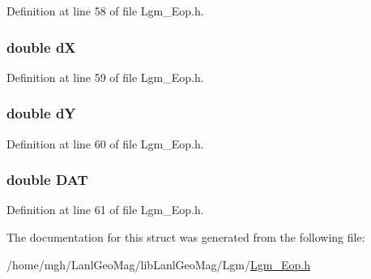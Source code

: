 Definition at line 58 of file Lgm\_\-Eop.h.\hypertarget{struct_lgm___eop_one_5559d17f092df97e1797a76209e0caa0}{
\subsubsection[{dX}]{\setlength{\rightskip}{0pt plus 5cm}double {\bf dX}}}
\label{struct_lgm___eop_one_5559d17f092df97e1797a76209e0caa0}




Definition at line 59 of file Lgm\_\-Eop.h.\hypertarget{struct_lgm___eop_one_5b69e4344b7089d8a3c6db32a3c38551}{
\subsubsection[{dY}]{\setlength{\rightskip}{0pt plus 5cm}double {\bf dY}}}
\label{struct_lgm___eop_one_5b69e4344b7089d8a3c6db32a3c38551}




Definition at line 60 of file Lgm\_\-Eop.h.\hypertarget{struct_lgm___eop_one_e588c8af37ba03583b88718e40df15f2}{
\subsubsection[{DAT}]{\setlength{\rightskip}{0pt plus 5cm}double {\bf DAT}}}
\label{struct_lgm___eop_one_e588c8af37ba03583b88718e40df15f2}




Definition at line 61 of file Lgm\_\-Eop.h.

The documentation for this struct was generated from the following file:\begin{CompactItemize}
\item 
/home/mgh/LanlGeoMag/libLanlGeoMag/Lgm/\hyperlink{_lgm___eop_8h}{Lgm\_\-Eop.h}\end{CompactItemize}
